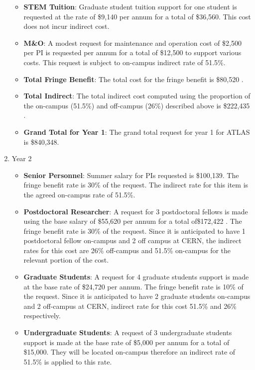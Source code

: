 \begin{enumerate}
\begin{itemize}
\item {{\bf STEM Tuition}: Graduate student tuition support for one student is requested at the rate of \$9,140 per annum for a total of \$36,560.  This cost does not incur indirect cost.}

\item {{\bf M\&O}: A modest request for maintenance and operation cost of \$2,500 per PI is requested per annum for a total of \$12,500 to support various costs. This request is subject to on-campus indirect rate of 51.5\%.}

\item {{\bf Total Fringe Benefit}: The total cost for the fringe benefit is \$80,520 .}

\item {{\bf Total Indirect}: The total indirect cost computed using the proportion of the on-campus (51.5\%) and off-campus (26\%) described above is \$222,435 .}

\item {{\bf Grand Total for Year 1}: The grand total request for year 1 for ATLAS is \$840,348.}

\end{itemize}

\item{Year 2}
\begin{itemize}
\item{{\bf Senior Personnel}: Summer salary for PIs requested is \$100,139.   The fringe benefit rate is 30\% of the request.  The indirect rate for this item is the agreed on-campus rate of 51.5\%.}

\item {{\bf Postdoctoral Researcher}:  A request for 3 postdoctoral fellows is made using the base salary of \$55,620 per annum for a total of\$172,422 .  The fringe benefit rate is 30\% of the request.  Since it is anticipated to have 1 postdoctoral fellow on-campus and 2 off campus at CERN, the indirect rates for this cost are 26\% off-campus and 51.5\% on-campus for the relevant portion of the cost.} 

\item{{\bf Graduate Students}: A request for 4 graduate students support is made at the base rate of \$24,720 per annum.   The fringe benefit rate is 10\% of the request.  Since it is anticipated to have 2 graduate students on-campus and 2 off-campus at CERN, indirect rate for this cost 51.5\% and 26\% respectively.}

\item {{\bf Undergraduate Students}: A request of 3 undergraduate students support is made at the base rate of \$5,000 per annum for a total of \$15,000. They will be located on-campus therefore an indirect rate of 51.5\% is applied to this rate. }


\end{itemize}
\end{enumerate}
